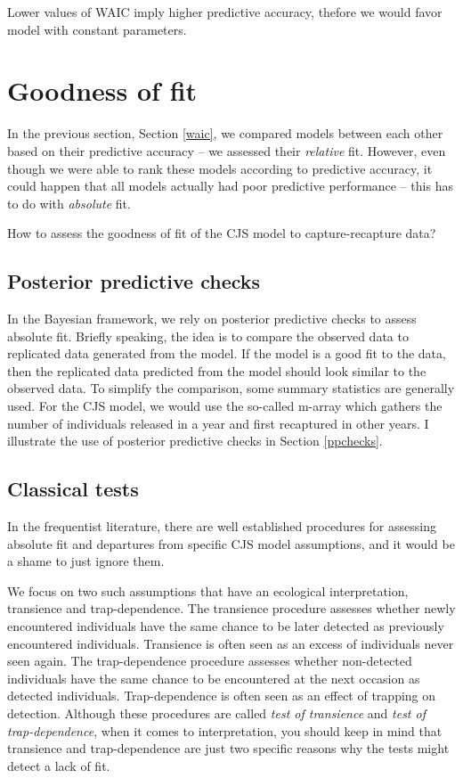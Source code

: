 \documentclass[
  12pt,
]{krantz}
\begin{document}
Lower values of WAIC imply higher predictive accuracy, thefore we would favor model with constant parameters.

\section{Goodness of fit}\label{gof}

In the previous section, Section \ref{waic}, we compared models between each other based on their predictive accuracy -- we assessed their \emph{relative} fit. However, even though we were able to rank these models according to predictive accuracy, it could happen that all models actually had poor predictive performance -- this has to do with \emph{absolute} fit.

How to assess the goodness of fit of the CJS model to capture-recapture data?

\subsection{Posterior predictive checks}\label{posterior-predictive-checks}

In the Bayesian framework, we rely on posterior predictive checks to assess absolute fit. Briefly speaking, the idea is to compare the observed data to replicated data generated from the model. If the model is a good fit to the data, then the replicated data predicted from the model should look similar to the observed data. To simplify the comparison, some summary statistics are generally used. For the CJS model, we would use the so-called m-array which gathers the number of individuals released in a year and first recaptured in other years. I illustrate the use of posterior predictive checks in Section \ref{ppchecks}.

\subsection{Classical tests}\label{classical-tests}

In the frequentist literature, there are well established procedures for assessing absolute fit and departures from specific CJS model assumptions, and it would be a shame to just ignore them.

We focus on two such assumptions that have an ecological interpretation, transience and trap-dependence. The transience procedure assesses whether newly encountered individuals have the same chance to be later detected as previously encountered individuals. Transience is often seen as an excess of individuals never seen again. The trap-dependence procedure assesses whether non-detected individuals have the same chance to be encountered at the next occasion as detected individuals. Trap-dependence is often seen as an effect of trapping on detection. Although these procedures are called \emph{test of transience} and \emph{test of trap-dependence}, when it comes to interpretation, you should keep in mind that transience and trap-dependence are just two specific reasons why the tests might detect a lack of fit.
\end{document}
